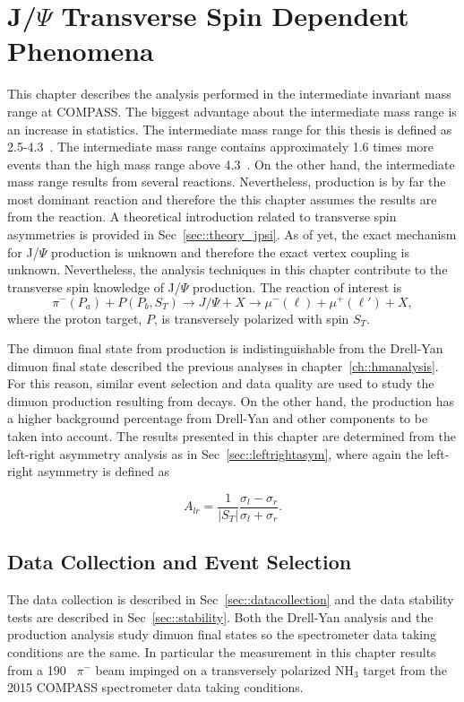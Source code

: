 \chapter{J/$\Psi$ Transverse Spin Dependent Phenomena}
\label{ch::jpsi}
\ifpdf
\graphicspath{{Chapters/JPsi/Figs/}}
\fi

This chapter describes the analysis performed in the intermediate invariant mass
range at COMPASS.  The biggest advantage about the intermediate mass range is an
increase in statistics.  The intermediate mass range for this thesis is defined
as 2.5-4.3~{\gvcw}.  The intermediate mass range contains approximately 1.6
times more events than the high mass range above 4.3~{\gvcw}.  On the other
hand, the intermediate mass range results from several reactions.  Nevertheless,
{\jp} production is by far the most dominant reaction and therefore the this
chapter assumes the results are from the {\jp} reaction.  A theoretical
introduction related to transverse {\jp} spin asymmetries is provided in
Sec~\ref{sec::theory_jpsi}.  As of yet, the exact mechanism for J/$\Psi$
production is unknown and therefore the exact {\jp} vertex coupling is unknown.
Nevertheless, the analysis techniques in this chapter contribute to the
transverse spin knowledge of J/$\Psi$ production.  The reaction of
interest is
\begin{equation}
  \pi^-(P_a) + P(P_b, S_T) \rightarrow J/\Psi + X \rightarrow \mu^-(\ell) +
  \mu^+(\ell') + X,
\end{equation}
\noindent
where the proton target, $P$, is transversely polarized with spin $S_T$.

The dimuon final state from {\jp} production is indistinguishable from the
Drell-Yan dimuon final state described the previous analyses in
chapter~\ref{ch::hmanalysis}.  For this reason, similar event selection and data
quality are used to study the dimuon production resulting from {\jp} decays.  On
the other hand, the {\jp} production has a higher background percentage from
Drell-Yan and other components to be taken into account.  The results presented
in this chapter are determined from the left-right asymmetry analysis as in
Sec~\ref{sec::leftrightasym}, where again the left-right asymmetry is defined as

\begin{equation}
  A_{lr} = \frac{1}{|S_T|}
  \frac{\sigma_l - \sigma_r}{\sigma_l +
    \sigma_r}.
\end{equation}

\section{Data Collection and Event Selection}
The data collection is described in Sec~\ref{sec::datacollection} and the data
stability tests are described in Sec~\ref{sec::stability}.  Both the Drell-Yan
analysis and the {\jp} production analysis study dimuon final states so the
spectrometer data taking conditions are the same.  In particular the measurement
in this chapter results from a 190~{\gvc} $\pi^-$ beam impinged on a
transversely polarized NH$_3$ target from the 2015 COMPASS spectrometer data
taking conditions.

